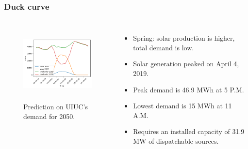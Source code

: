 \begin{frame}
\frametitle{Duck curve}
\begin{columns}
    \column[t]{4.5cm}
	\begin{figure}[htbp!]
		\begin{center}
			\includegraphics[height=4.0cm]{images/uiuc-duck}
		\end{center}
		\caption{Prediction on UIUC's demand for 2050.}
	\end{figure}

    \column[t]{5.5cm}
    \begin{itemize}
 		\item Spring: solar production is higher, total demand is low.
 		\item Solar generation peaked on April 4, 2019.
 		\item Peak demand is 46.9 MWh at 5 P.M.
 		\item Lowest demand is 15 MWh at 11 A.M.
 		\item Requires an installed capacity of 31.9 MW of dispatchable sources.
 	\end{itemize}

\end{columns}
\end{frame}


